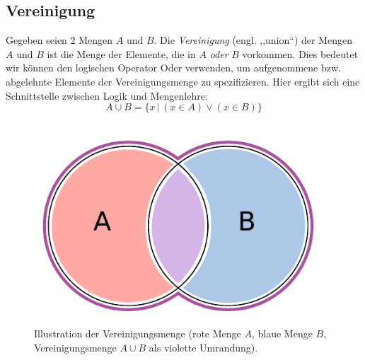 \subsection{Vereinigung}
%
Gegeben seien 2 Mengen $A$ und $B$. Die \emph{Vereinigung} (engl. ,,union``) der Mengen
$A$ und $B$ ist die Menge der Elemente, die in $A$ \emph{oder} $B$ vorkommen.
Dies bedeutet wir können den logischen Operator Oder verwenden, um aufgenommene
bzw. abgelehnte Elemente der Vereinigungsmenge zu spezifizieren. Hier ergibt
sich eine Schnittstelle zwischen Logik und Mengenlehre:
%
\[
    A \cup B = \{x \,|\, (x \in A) \lor (x \in B)\}
\]
%
\begin{figure}[p]
 \begin{center}
  \includegraphics{img/union.pdf}
  \caption{Illustration der Vereinigungsmenge (rote Menge $A$, blaue Menge $B$,
        Vereinigungsmenge $A \cup B$ als violette Umrandung).}
  \label{fig:union}
 \end{center}
\end{figure}

